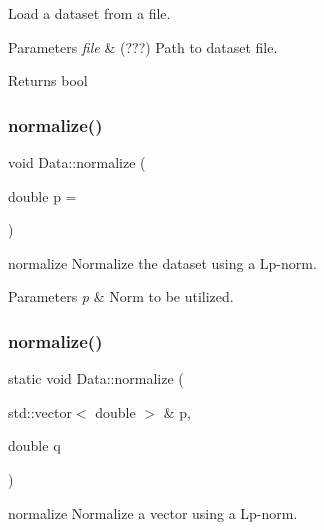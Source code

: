 Load a dataset from a file. 


\begin{DoxyParams}{Parameters}
{\em file} & (???) Path to dataset file. \\
\hline
\end{DoxyParams}
\begin{DoxyReturn}{Returns}
bool 
\end{DoxyReturn}
\mbox{\label{class_data_a38bbab57bd9d871bd78771df47529d6b}} 
\subsubsection{\texorpdfstring{normalize()}{normalize()}\hspace{0.1cm}{\footnotesize\ttfamily [1/2]}}
{\footnotesize\ttfamily void Data\+::normalize (\begin{DoxyParamCaption}\item[{double}]{p = {} }\end{DoxyParamCaption})}



normalize Normalize the dataset using a Lp-\/norm. 


\begin{DoxyParams}{Parameters}
{\em p} & Norm to be utilized. \\
\hline
\end{DoxyParams}
\mbox{\label{class_data_acd8fd65a56a3d097d1bc19fb8249ee20}} 
\subsubsection{\texorpdfstring{normalize()}{normalize()}\hspace{0.1cm}{\footnotesize\ttfamily [2/2]}}
{\footnotesize\ttfamily static void Data\+::normalize (\begin{DoxyParamCaption}\item[{std\+::vector$<$ double $>$ \&}]{p,  }\item[{double}]{q }\end{DoxyParamCaption})\hspace{0.3cm}{\ttfamily [static]}}



normalize Normalize a vector using a Lp-\/norm. 


